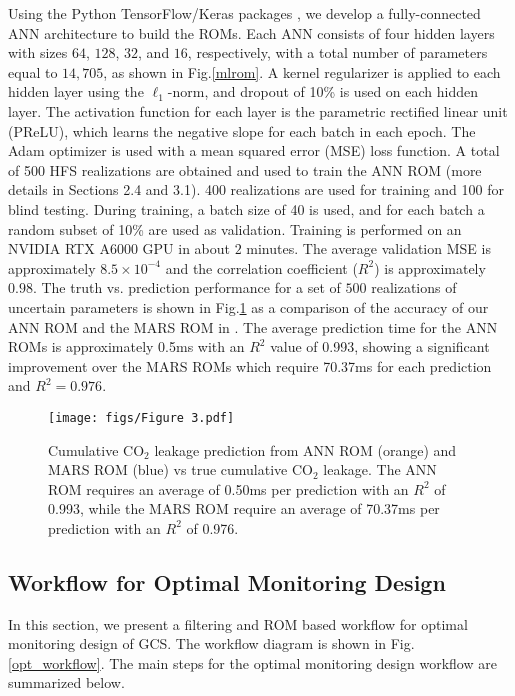 \documentclass[a4paper,fleqn]{cas-sc}
\begin{document}
Using the Python TensorFlow/Keras packages \citep{chollet2015keras}, we develop a fully-connected ANN architecture to build the ROMs. Each ANN consists of four hidden layers with sizes $64$, $128$, $32$, and $16$, respectively, with a total number of parameters equal to $14,705$, as shown in Fig.\ref{mlrom}. A kernel regularizer is applied to each hidden layer using the $\ell_1$-norm, and dropout of 10\% is used on each hidden layer. The activation function for each layer is the parametric rectified linear unit (PReLU), which learns the negative slope for each batch in each epoch. The Adam optimizer is used with a mean squared error (MSE) loss function. A total of 500 HFS realizations are obtained and used to train the ANN ROM (more details in Sections 2.4 and 3.1). 400 realizations are used for training and 100 for blind testing. During training, a batch size of 40 is used, and for each batch a random subset of 10\% are used as validation. Training is performed on an NVIDIA RTX A$6000$ GPU in about $2$ minutes. The average validation MSE is approximately $8.5\times10^{-4}$ and the correlation coefficient ($R^2$) is approximately $0.98$. The truth vs. prediction performance for a set of $500$ realizations of uncertain parameters is shown in Fig.\ref{rom_train} as a comparison of the accuracy of our ANN ROM and the MARS ROM in \citet{Chen2018}. The average prediction time for the ANN ROMs is approximately 0.5ms with an $R^2$ value of 0.993, showing a significant improvement over the MARS ROMs which require 70.37ms for each prediction and $R^2=0.976$.

\begin{figure}[h]
    \centering
    \texttt{[image: figs/Figure 3.pdf]}
    \caption{Cumulative CO$_2$ leakage prediction from ANN ROM (orange) and MARS ROM (blue) vs true cumulative CO$_2$ leakage. The ANN ROM requires an average of 0.50ms per prediction with an $R^2$ of 0.993, while the MARS ROM require an average of 70.37ms per prediction with an $R^2$ of 0.976.}
    \label{rom_train}
\end{figure}

\subsection{Workflow for Optimal Monitoring Design}
In this section, we present a filtering and ROM based workflow for optimal monitoring design of GCS. The workflow diagram is shown in Fig. \ref{opt_workflow}. The main steps for the optimal monitoring design workflow are summarized below.
\end{document}
